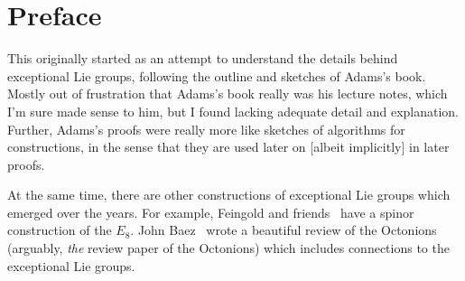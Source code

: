 \chapter*{Preface}

This originally started as an attempt to understand the details behind
exceptional Lie groups, following the outline and sketches of Adams's
book. Mostly out of frustration that Adams's book really was his lecture
notes, which I'm sure made sense to him, but I found lacking adequate
detail and explanation. Further, Adams's proofs were really more like
sketches of algorithms for constructions, in the sense that they are
used later on [albeit implicitly] in later proofs.

At the same time, there are other constructions of exceptional Lie
groups which emerged over the years. For example, Feingold and
friends~\cite{Feingold:1991:spinor-e8} have a spinor construction of the
$E_{8}$. 
John Baez~\cite{Baez:2001dm} wrote a beautiful review of the Octonions
(arguably, \emph{the} review paper of the Octonions) which includes
connections to the exceptional Lie groups.
